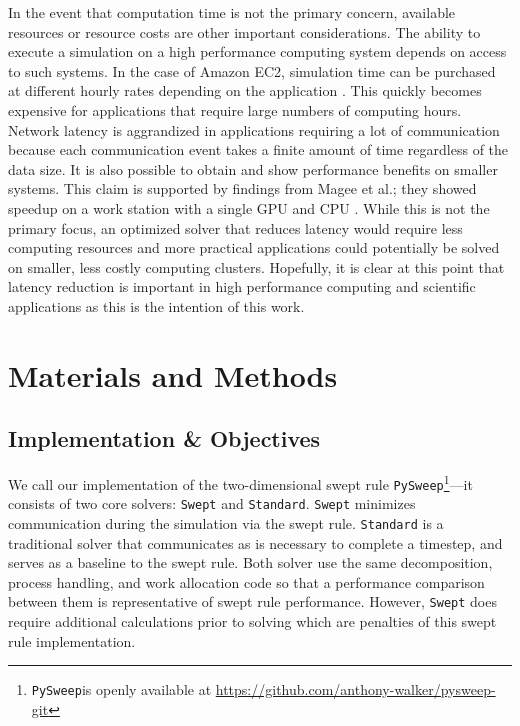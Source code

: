 \documentclass[preprints,article,accept,moreauthors,pdftex]{Definitions/mdpi}
\def\github{\url{https://github.com/anthony-walker/pysweep-git}}
\def\pysweep{\texttt{PySweep}}
\def\Swept{\texttt{Swept}}
\def\Standard{\texttt{Standard}}
\begin{document}
\par
In the event that computation time is not the primary concern, available resources or resource costs are other important considerations. The ability to execute a simulation on a high performance computing system depends on access to such systems. In the case of Amazon EC2, simulation time can be purchased at different hourly rates depending on the application \cite{AmazonServices}. This quickly becomes expensive for applications that require large numbers of computing hours. Network latency is aggrandized in applications requiring a lot of communication because each communication event takes a finite amount of time regardless of the data size. It is also possible to obtain and show performance benefits on smaller systems. This claim is supported by findings from Magee et al.; they showed speedup on a work station with a single GPU and CPU \cite{Magee2018AcceleratingDecomposition}. While this is not the primary focus, an optimized solver that reduces latency would require less computing resources and more practical applications could potentially be solved on smaller, less costly computing clusters. Hopefully, it is clear at this point that latency reduction is important in high performance computing and scientific applications as this is the intention of this work.


\section{Materials and Methods}
\label{methods-section}
\subsection{Implementation \& Objectives}
We call our implementation of the two-dimensional swept rule \pysweep{}\footnote{\pysweep is openly available at \github}---it consists of two core solvers: \Swept{} and \Standard{}. \Swept{} minimizes communication during the simulation via the swept rule. \Standard{} is a traditional solver that communicates as is necessary to complete a timestep, and serves as a baseline to the swept rule. Both solver use the same decomposition, process handling, and work allocation code so that a performance comparison between them is representative of swept rule performance. However, \Swept{} does require additional calculations prior to solving which are penalties of this swept rule implementation. 
\end{document}

